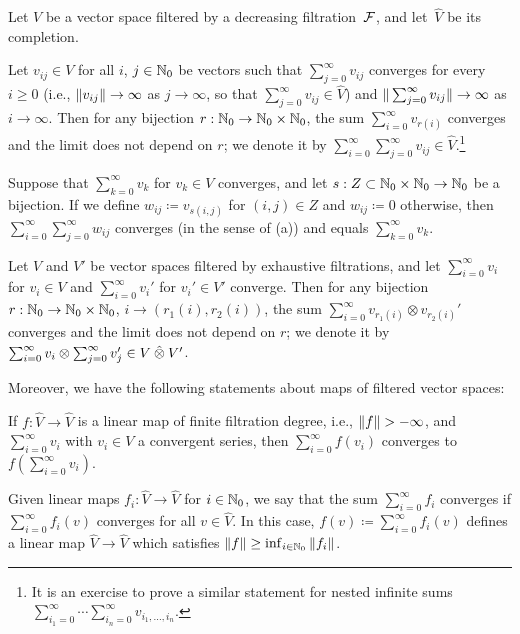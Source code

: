 \documentclass[\MainFolder/Text.tex]{subfiles}
\begin{document}
\begin{Lemma}\label{Lem:TechLem}
Let $V$ be a vector space filtered by a decreasing filtration~$\mathcal{F}$, and let~$\hat{V}$ be its completion. 
\begin{ClaimList}
\item Let $v_{ij}\in V$ for all $i$, $j\in\mathbb{N}_0$ be vectors such that $\sum_{j=0}^\infty v_{ij}$ converges for every $i\ge 0$ (i.e., $\| v_{ij} \|\to\infty$ as $j\to\infty$, so that $\sum_{j=0}^\infty v_{ij}\in\hat{V}$) and $\| \sum_{j=0}^\infty v_{ij} \| \to \infty$ as $i\to \infty$. Then for any bijection $r: \mathbb{N}_0\rightarrow \mathbb{N}_0 \times \mathbb{N}_0$, the sum $\sum_{i=0}^\infty v_{r(i)}$ converges and the limit does not depend on $r$; we denote it by $\sum_{i=0}^\infty\sum_{j=0}^\infty v_{ij} \in \hat{V}$.\footnote{It is an exercise to prove a similar statement for nested infinite sums $\sum_{i_1=0}^\infty \dotsb \sum_{i_n=0}^\infty v_{i_1,\dotsc,i_n}$.}
\item Suppose that $\sum_{k=0}^\infty v_k$ for $v_k\in V$ converges, and let $s: Z\subset \mathbb{N}_0\times \mathbb{N}_0 \rightarrow \mathbb{N}_0$ be a bijection. If we define $w_{ij} \coloneqq v_{s(i,j)}$ for $(i,j)\in Z$ and $w_{ij} \coloneqq 0$ otherwise, then $\sum_{i=0}^\infty \sum_{j=0}^\infty w_{ij}$ converges (in the sense of (a)) and equals $\sum_{k=0}^\infty v_k$.
\item Let $V$ and $V'$ be vector spaces filtered by exhaustive filtrations, and let $\sum_{i=0}^\infty v_{i}$ for $v_i\in V$ and $\sum_{i=0}^\infty v_{i}'$ for $v_i'\in V'$ converge. Then for any bijection $r: \mathbb{N}_0 \rightarrow \mathbb{N}_0 \times \mathbb{N}_0$, $i\to (r_1(i),r_2(i))$, the sum $\sum_{i=0}^\infty v_{r_1(i)}\otimes v_{r_2(i)}'$ converges and the limit does not depend on $r$; we denote it by $\sum_{i=0}^\infty v_i \otimes \sum_{j=0}^\infty v_j' \in V\COtimes V'$.
\end{ClaimList}
Moreover, we have the following statements about maps of filtered vector spaces:
\begin{ClaimList}[resume]
\item If $f: \hat{V}\rightarrow\hat{V}$ is a linear map of finite filtration degree, i.e., $\Norm{f}>-\infty$, and $\sum_{i=0}^\infty v_i$ with $v_i\in V$ a convergent series, then $\sum_{i=0}^\infty f(v_i)$ converges to $f(\sum_{i=0}^\infty v_i)$.
\item Given linear maps $f_i: \hat{V}\to \hat{V}$ for $i\in \mathbb{N}_0$, we say that the sum $\sum_{i=0}^\infty f_i$ converges if $\sum_{i=0}^\infty f_i(v)$ converges for all $v\in \hat{V}$. In this case, $f(v) \coloneqq \sum_{i=0}^\infty f_i(v)$ defines a linear map $\hat{V}\rightarrow\hat{V}$ which satisfies $\| f \|\ge \inf_{i\in\mathbb{N}_0} \| f_i \|$.
\end{ClaimList}
\end{Lemma}
\end{document}
